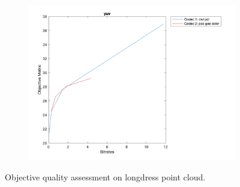 \documentclass{article}
\begin{document}
\begin{figure}
    \begin{subfigure}[b]{0.65\textwidth}
    \includegraphics[width=\textwidth]{Figures/task2/longdress_yuv.png}
    \end{subfigure}
    \caption{Objective quality assessment on \textsf{longdress} point cloud.}
    \label{fig:obj_longdress}
\end{figure}
\end{document}
